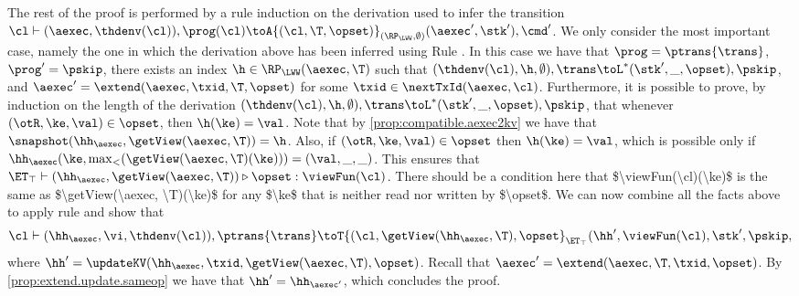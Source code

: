 The rest of the proof is performed by a rule induction on the derivation used to infer 
the transition $\cl \vdash (\aexec, \thdenv(\cl)), \prog(\cl) \toA{(\cl, \T, \opset)}_{(\RP_{\LWW}, \emptyset)} (\aexec', \stk'), \cmd'$. 
We only consider the most important case, namely the one in which the derivation above 
has been inferred using Rule . In this case we have that 
$\prog = \ptrans{\trans}$, $\prog' = \pskip$, there exists an index $\h \in \RP_{\LWW}(\aexec, \T)$ such that 
$(\thdenv(\cl), \h, \emptyset), \trans \toL^{\ast} (\stk', \_, \opset), \pskip$, and $\aexec' = 
\extend(\aexec, \txid, \T, \opset)$ for some $\txid \in \nextTxId(\aexec, \cl)$. 
Furthermore, it is possible to prove, by induction on the length of the derivation $(\thdenv(\cl), \h, \emptyset), \trans \toL^{\ast} (\stk', \_, \opset), \pskip$, 
that whenever $(\otR, \ke, \val) \in \opset$, then $\h(\ke) = \val$.
Note that by \cref{prop:compatible.aexec2kv} we have that $\snapshot(\hh_{\aexec}, \getView(\aexec, \T)) = 
\h$. Also, if $(\otR,\ke, \val) \in \opset$ then $\h(\ke) = \val$, which is possible only if  
$\hh_{\aexec}(\ke, \max_{<}(\getView(\aexec, \T)(\ke))) = (\val, \_, \_)$. This ensures 
that $\ET_{\top} \vdash (\hh_{\aexec}, \getView(\aexec, \T)) \triangleright \opset: \viewFun(\cl)$. 
\ac{There should be a condition here that $\viewFun(\cl)(\ke)$ is the same as $\getView(\aexec, \T)(\ke)$ 
for any $\ke$ that is neither read nor written by $\opset$.} 
We can now combine all the facts above to apply rule  and show that 
\[
\cl \vdash (\hh_{\aexec}, \vi, \thdenv(\cl)), \ptrans{\trans} \toT{(\cl, \getView(\hh_{\aexec}, \T), \opset}_{\ET_{\top}} 
(\hh', \viewFun(\cl), \stk', \pskip, 
\] 
where $\hh' = \updateKV(\hh_{\aexec}, \txid, \getView(\aexec, \T), \opset)$. 
Recall that $\aexec' = \extend(\aexec, \T, \txid, \opset)$. 
By \cref{prop:extend.update.sameop} we have that $\hh' = \hh_{\aexec'}$, 
which concludes the proof.

